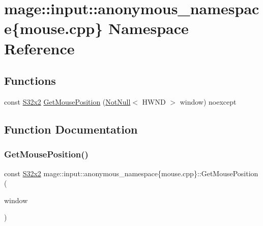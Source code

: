 \hypertarget{namespacemage_1_1input_1_1anonymous__namespace_02mouse_8cpp_03}{}\section{mage\+:\+:input\+:\+:anonymous\+\_\+namespace\{mouse.\+cpp\} Namespace Reference}
\label{namespacemage_1_1input_1_1anonymous__namespace_02mouse_8cpp_03}
\subsection*{Functions}
\begin{DoxyCompactItemize}
\item 
const \mbox{\hyperlink{namespacemage_aad06aca0b442d3b41653eafed822d571}{S32x2}} \mbox{\hyperlink{namespacemage_1_1input_1_1anonymous__namespace_02mouse_8cpp_03_a0bfbce60832af3992580d0f8bedd30fe}{Get\+Mouse\+Position}} (\mbox{\hyperlink{namespacemage_a8769f9d670d6b585ea306cb1062af94b}{Not\+Null}}$<$ H\+W\+ND $>$ window) noexcept
\end{DoxyCompactItemize}


\subsection{Function Documentation}
\mbox{\label{namespacemage_1_1input_1_1anonymous__namespace_02mouse_8cpp_03_a0bfbce60832af3992580d0f8bedd30fe}} 
\subsubsection{\texorpdfstring{Get\+Mouse\+Position()}{GetMousePosition()}}
{\footnotesize\ttfamily const \mbox{\hyperlink{namespacemage_aad06aca0b442d3b41653eafed822d571}{S32x2}} mage\+::input\+::anonymous\+\_\+namespace\{mouse.\+cpp\}\+::Get\+Mouse\+Position (\begin{DoxyParamCaption}\item[{\mbox{\hyperlink{namespacemage_a8769f9d670d6b585ea306cb1062af94b}{Not\+Null}}$<$ H\+W\+ND $>$}]{window }\end{DoxyParamCaption})\hspace{0.3cm}{\ttfamily [noexcept]}}

